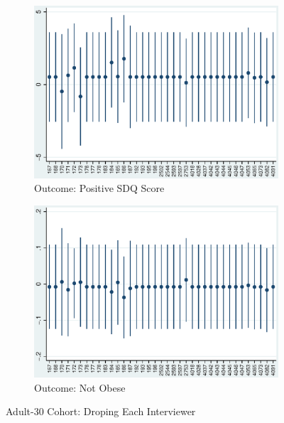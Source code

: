     \begin{figure}[H]
      \centering
        \begin{subfigure}[t]{0.81\textwidth}
          \includegraphics[width=\textwidth]{../../../output/image/coef-interviewer-adult30-votoMaturita.eps}       
\caption{Outcome: Positive SDQ Score}        
        \end{subfigure}
        \begin{subfigure}[t]{0.81\textwidth}
          \includegraphics[width=\textwidth]{../../../output/image/coef-interviewer-adult30-BMI_obese.eps}       
 \caption{Outcome: Not Obese}        
        \end{subfigure}
      \caption{Adult-30 Cohort: Droping Each Interviewer}  \label{fig:adult30-sensitivity-interviewer}
    \end{figure}


